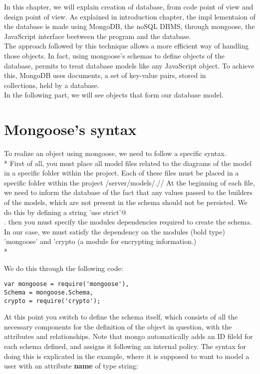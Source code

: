 
In this chapter, we will explain creation of database, from code point of view and design point of view. As explained in introduction chapter, the impl
lementaion of the database is made using MongoDB, the noSQL DBMS, through mongoose, the JavaScript interface beetween the program and the database.
\\
The approach followed by this technique allows a more efficient way of handling those objects. In fact, using mongoose's schemas to define objects of the\\
database, permits to treat database models like any JavaScript object. To achieve this, MongoDB uses documents, a set of key-value pairs, stored in \\
collections, held by a database. 
\\
In the following part, we will see objects that form our database model.

\section{Mongoose's syntax}
To realize an object using mongoose, we need to follow a specific syntax. \\* First of all, you must place all model files related to the diagrams of the model in a specific folder within the project. Each of these files must be placed in a specific folder within the project /server/models/.//
At the beginning of each file, we need to inform the database of the fact that any values ​​passed to the builders of the models, which are not present in the schema should not be persisted. We do this by defining a string \mbox{}\verb@ 'use strict'@\\.
then you must specify the modules dependencies required to create the schema. In our case, we must satisfy the dependency on the modules (bold type) 'mongoose' and 'crypto (a module for encrypting information.) \\*   

We do this through the following code: 


\begin{lstlisting}      
var mongoose = require('mongoose'),
Schema = mongoose.Schema,
crypto = require('crypto');
\end{lstlisting}

At this point you switch to define the schema itself, which consists of all the necessary components for the definition of the object in question, with the attributes and relationships. Note that mongo automatically adds an ID fileld for each schema defined, and assigns it following an internal policy.
The syntax for doing this is explicated in the example, where it is supposed to want to model a user with an attribute \textbf{name} of type string: 

